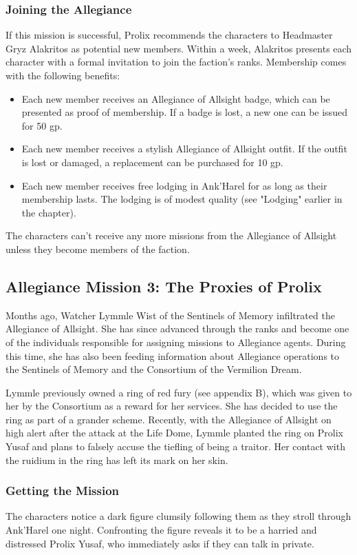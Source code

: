 \documentclass[10pt,a4paper,twoside,twocolumn,openany,nodeprecatedcode]{dndbook}
\begin{document}
\subsubsection{Joining the Allegiance}
If this mission is successful, Prolix recommends the characters to Headmaster Gryz Alakritos as potential new members. Within a week, Alakritos presents each character with a formal invitation to join the faction's ranks. Membership comes with the following benefits:


\begin{itemize}
\item Each new member receives an Allegiance of Allsight badge, which can be presented as proof of membership. If a badge is lost, a new one can be issued for 50 gp.
\item Each new member receives a stylish Allegiance of Allsight outfit. If the outfit is lost or damaged, a replacement can be purchased for 10 gp.
\item Each new member receives free lodging in Ank'Harel for as long as their membership lasts. The lodging is of modest quality (see "Lodging" earlier in the chapter).
\end{itemize}

The characters can't receive any more missions from the Allegiance of Allsight unless they become members of the faction.

\subsection{Allegiance Mission 3: The Proxies of Prolix}
Months ago, Watcher Lymmle Wist of the Sentinels of Memory infiltrated the Allegiance of Allsight. She has since advanced through the ranks and become one of the individuals responsible for assigning missions to Allegiance agents. During this time, she has also been feeding information about Allegiance operations to the Sentinels of Memory and the Consortium of the Vermilion Dream.

Lymmle previously owned a ring of red fury (see appendix B), which was given to her by the Consortium as a reward for her services. She has decided to use the ring as part of a grander scheme. Recently, with the Allegiance of Allsight on high alert after the attack at the Life Dome, Lymmle planted the ring on Prolix Yusaf and plans to falsely accuse the tiefling of being a traitor. Her contact with the ruidium in the ring has left its mark on her skin.

\subsubsection{Getting the Mission}
The characters notice a dark figure clumsily following them as they stroll through Ank'Harel one night. Confronting the figure reveals it to be a harried and distressed Prolix Yusaf, who immediately asks if they can talk in private.
\end{document}
